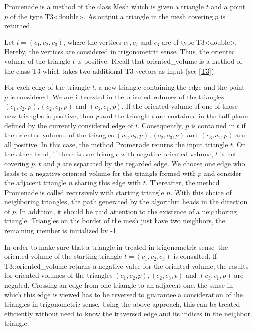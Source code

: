 \documentclass[10pt]{article}
\begin{document}
{\ttfamily Promenade} is a method of the class {\ttfamily Mesh} which is given a triangle $t$ and a point $p$ of the type {\ttfamily T3<double>}. As output a triangle in the mesh covering $p$ is returned. 

Let $ t = (c_1,c_2,c_3)$, where the vertices $c_1,c_2$ and $c_3$ are of type {\ttfamily T3<double>}. Hereby, the vertices are considered in trigonometric sense. Thus, the oriented volume of the triangle $t$ is positive. Recall that {\ttfamily oriented\_volume} is a method of the class {\ttfamily T3} which takes two additional {\ttfamily T3} vectors as input (see \ref{T3}).

For each edge of the triangle $t$, a new triangle containing the edge and the point $p$ is considered. We are interested in the oriented volumes of the triangles $(c_1,c_2,p), (c_2,c_3,p)$ and $(c_3,c_1,p)$. If the oriented volume of one of those new triangles is positive, then $p$ and the triangle $t$ are contained in the half plane defined by the currently considered edge of $t$. Consequently, $p$ is contained in $t$ if the oriented volumes of the triangles $(c_1,c_2,p), (c_2,c_3,p)$ and $(c_3,c_1,p)$ are all positive. In this case, the method {\ttfamily Promenade} returns the input triangle $t$. On the other hand, if there is one triangle with negative oriented volume, $t$ is not covering $p$. $t$ and $p$ are separated by the regarded edge. We choose one edge who leads to a negative oriented volume for the triangle formed with $p$ and consider the adjacent triangle $n$ sharing this edge with $t$. Thereafter, the method {\ttfamily Promenade} is called recursively with starting triangle $n$. With this choice of neighboring triangles, the path generated by the algorithm heads in the direction of $p$. In addition, it should be paid attention to the existence of a neighboring triangle. Triangles on the border of the mesh just have two neighbors, the remaining member is initialized by -1.

In order to make sure that a triangle in treated in trigonometric sense, the oriented volume of the starting triangle $t = (c_1,c_2,c_3)$ is consulted. If {\ttfamily T3::oriented\_volume} returns a negative value for the oriented volume, the results for oriented volumes of the triangles $(c_1,c_2,p), (c_2,c_3,p)$ and $(c_3,c_1,p)$ are negated. Crossing an edge from one triangle to an adjacent one, the sense in which this edge is viewed has to be reversed to guarantee a consideration of the triangles in trigonometric sense. Using the above approach, this can be treated efficiently without need to know the traversed edge and its indices in the neighbor triangle.
\end{document}
